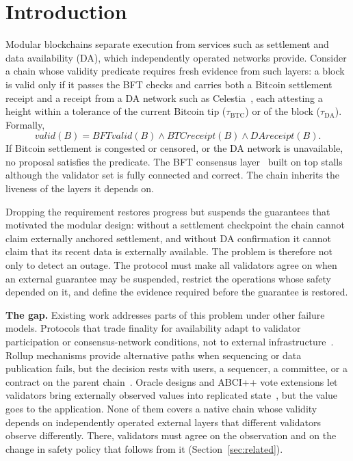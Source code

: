 \section{Introduction}
\label{sec:intro}

Modular blockchains separate execution from services such as settlement and
data availability (DA), which independently operated networks provide. Consider
a chain whose validity predicate requires fresh evidence from such layers: a
block is valid only if it passes the BFT checks and carries both a Bitcoin
settlement receipt and a receipt from a DA network such as
Celestia~\cite{albassam2019lazyledger}, each attesting a height within a
tolerance of the current Bitcoin tip ($\tau_{\text{BTC}}$) or of the block ($\tau_{\text{DA}}$). Formally,
\[
\mathit{valid}(B) = \mathit{BFTvalid}(B) \wedge \mathit{BTCreceipt}(B)
\wedge \mathit{DAreceipt}(B).
\]
If Bitcoin settlement is congested or censored, or the DA network is
unavailable, no proposal satisfies the predicate. The BFT consensus
layer~\cite{buchman2016tendermint,buchman2018gossip} built on top stalls
although the validator set is fully connected and correct. The chain inherits
the liveness of the layers it depends on.

Dropping the requirement restores progress but suspends the guarantees that
motivated the modular design: without a settlement checkpoint the chain cannot
claim externally anchored settlement, and without DA confirmation it cannot
claim that its recent data is externally available. The problem is therefore
not only to detect an outage. The protocol must make all validators agree on
when an external guarantee may be suspended, restrict the operations whose
safety depended on it, and define the evidence required before the guarantee
is restored.

\textbf{The gap.} Existing work addresses parts of this problem under other
failure models. Protocols that trade finality for availability adapt to
validator participation or consensus-network conditions, not to external
infrastructure~\cite{neu2021ebbflow,buterin2020gasper}. Rollup mechanisms
provide alternative paths when sequencing or data publication fails, but the
decision rests with users, a sequencer, a committee, or a contract on the
parent chain~\cite{figueira2025escapehatch,arbitrum_anytrust,optimism_altda}.
Oracle designs and ABCI++ vote extensions let validators bring externally
observed values into replicated state~\cite{cosmos_adr064,slinky_oracle}, but
the value goes to the application. None of them covers a native chain whose
validity depends on independently operated external layers that different
validators observe differently. There, validators must agree on the observation
and on the change in safety policy that follows from it
(Section~\ref{sec:related}).

